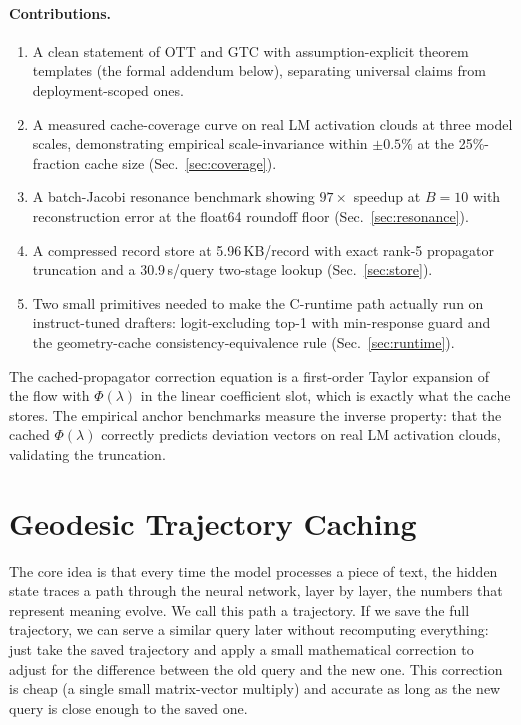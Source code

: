 \documentclass[11pt]{article}
\begin{document}
\paragraph{Contributions.}
\begin{enumerate}
  \item A clean statement of OTT and GTC with assumption-explicit theorem
        templates (the formal addendum below), separating universal claims from
        deployment-scoped ones.
  \item A measured cache-coverage curve on real LM activation clouds at three
        model scales, demonstrating empirical scale-invariance within
        $\pm 0.5\%$ at the 25\%-fraction cache size (Sec.~\ref{sec:coverage}).
  \item A batch-Jacobi resonance benchmark showing $97\times$ speedup at
        $B=10$ with reconstruction error at the float64 roundoff floor
        (Sec.~\ref{sec:resonance}).
  \item A compressed record store at 5.96\,KB/record with exact rank-5
        propagator truncation and a 30.9\,\textmu s/query two-stage lookup
        (Sec.~\ref{sec:store}).
  \item Two small primitives needed to make the C-runtime path actually run on
        instruct-tuned drafters: logit-excluding top-1 with min-response
        guard and the geometry-cache consistency-equivalence rule
        (Sec.~\ref{sec:runtime}).
\end{enumerate}


The cached-propagator correction equation is a first-order Taylor expansion of the
flow with $\Phi(\lambda)$ in the linear coefficient slot, which is exactly
what the cache stores.  The empirical anchor benchmarks measure the inverse
property: that the cached $\Phi(\lambda)$ correctly predicts deviation
vectors on real LM activation clouds, validating the truncation.

\section{Geodesic Trajectory Caching}
\label{sec:gtc}

The core idea is that every time the model processes a piece
of text, the hidden state traces a path through the neural network, layer by
layer, the numbers that represent meaning evolve. We call this path a
trajectory. If we save the full trajectory, we can serve a similar
query later without recomputing everything: just take the saved trajectory and
apply a small mathematical correction to adjust for the difference between the
old query and the new one. This correction is cheap (a single small
matrix-vector multiply) and accurate as long as the new query is close enough
to the saved one.
\end{document}
